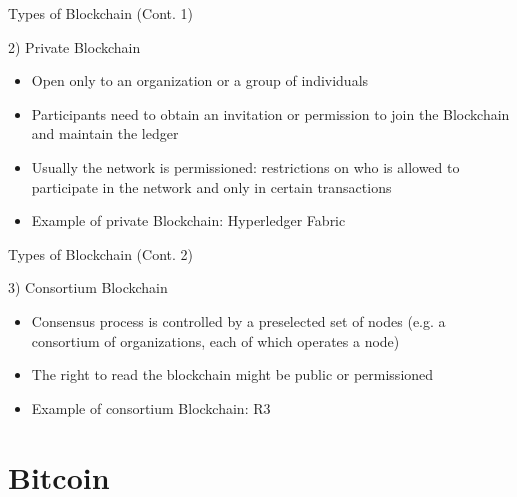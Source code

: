 \documentclass{beamer}
\begin{document}
  \begin{frame}{Types of Blockchain (Cont. 1)}
    \begin{block}{2) Private Blockchain}
      \begin{itemize}
        \item Open only to an organization or a group of individuals
        \item Participants need to obtain an invitation or permission to join the Blockchain and maintain the ledger
        \item Usually the network is permissioned: restrictions on who is allowed to participate in the network and only in certain transactions 
        \item Example of private Blockchain: Hyperledger Fabric \cite{hyperledger-fabric}
      \end{itemize}
    \end{block}
  \end{frame}




  \begin{frame}{Types of Blockchain (Cont. 2)}
    \begin{block}{3) Consortium Blockchain}
      \begin{itemize}
        \item Consensus process is controlled by a preselected set of nodes (e.g. a consortium of organizations, each of which operates a node) 
        \item The right to read the blockchain might be public or permissioned 
        \item Example of consortium Blockchain: R3 \cite{R3}
      \end{itemize}
    \end{block}
  \end{frame}










  \section{Bitcoin}
\end{document}
